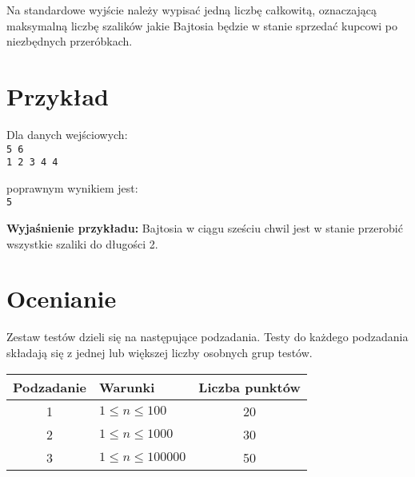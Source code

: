 \documentclass[10pt]{article}
\begin{document}
    Na standardowe wyjście należy wypisać jedną liczbę całkowitą, oznaczającą maksymalną liczbę szalików jakie Bajtosia będzie w stanie sprzedać kupcowi po niezbędnych przeróbkach.


    \section*{Przykład}
    
    \noindent
    \begin{minipage}[t]{0.5\textwidth}
        Dla danych wejściowych:\vspace{1ex}\\
        \texttt{5 6\\1 2 3 4 4}
    \end{minipage}
    \begin{minipage}[t]{0.5\textwidth}
        poprawnym wynikiem jest:\vspace{1ex}\\
        \texttt{5}
    \end{minipage}
    
    \vspace{2ex}
    \noindent\textbf{Wyjaśnienie przykładu:} Bajtosia w ciągu sześciu chwil jest w stanie przerobić wszystkie szaliki do długości 2.
    

    \section*{Ocenianie}
        
    Zestaw testów dzieli się na następujące podzadania. Testy do każdego podzadania składają się z jednej lub większej liczby osobnych grup testów.
    
    \begin{center}
        \begin{tabular}{ |c|p{9cm}|c| }
            \hline
            \textbf{Podzadanie} & \textbf{Warunki} & \textbf{Liczba punktów}\\
            \hline
            1 & $1\leq n\leq 100$ & 20\\
            \hline
            2 & $1\leq n\leq 1000$ & 30\\
            \hline
            3 & $1\leq n\leq 100000$ & 50\\
            \hline
        \end{tabular}
    \end{center}
\end{document}
